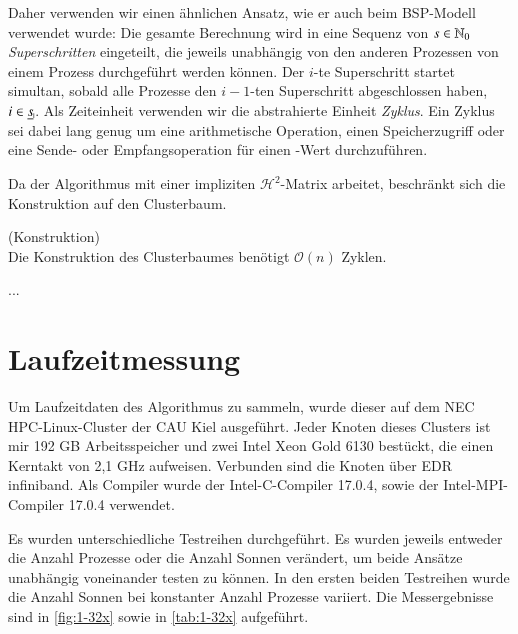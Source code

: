   Daher verwenden wir einen ähnlichen Ansatz, wie er auch beim BSP-Modell \citep{bsp} verwendet wurde: Die gesamte Berechnung wird in eine Sequenz von $s \in \mathbb{N}_0$ \textit{Superschritten} eingeteilt,
  die jeweils unabhängig von den anderen Prozessen von einem Prozess durchgeführt werden können. Der $i$-te Superschritt startet simultan, sobald alle Prozesse den $i-1$-ten Superschritt abgeschlossen
  haben, $i \in \haken{s}$. Als Zeiteinheit verwenden wir die abstrahierte Einheit \textit{Zyklus}. Ein Zyklus sei dabei lang genug um eine arithmetische Operation, einen Speicherzugriff oder eine Sende-
  oder Empfangsoperation für einen -Wert durchzuführen.
  
  Da der Algorithmus mit einer impliziten $\mathcal{H}^2$-Matrix arbeitet, beschränkt sich die Konstruktion auf den Clusterbaum.
  
  \begin{lem}
    (Konstruktion)\\
    Die Konstruktion des Clusterbaumes benötigt $\mathcal{O}(n)$ Zyklen.
  \end{lem}
  
  ...
  
  \section{Laufzeitmessung}
  Um Laufzeitdaten des Algorithmus zu sammeln, wurde dieser auf dem NEC HPC-Linux-Cluster der CAU Kiel ausgeführt. Jeder Knoten dieses Clusters ist mir 192 GB Arbeitsspeicher und zwei Intel Xeon Gold 
  6130 bestückt, die einen Kerntakt von 2,1 GHz aufweisen. Verbunden sind die Knoten über EDR infiniband. Als Compiler wurde der Intel-C-Compiler 17.0.4, sowie der Intel-MPI-Compiler 17.0.4 verwendet.
  
  Es wurden unterschiedliche Testreihen durchgeführt. Es wurden jeweils entweder die Anzahl Prozesse oder die Anzahl Sonnen verändert, um beide Ansätze unabhängig voneinander testen zu können.
  In den ersten beiden Testreihen wurde die Anzahl Sonnen bei konstanter Anzahl Prozesse variiert. Die Messergebnisse sind in \autoref{fig:1-32x} sowie in \autoref{tab:1-32x} 
  aufgeführt.
  
  
  
  \blindtext
  
  